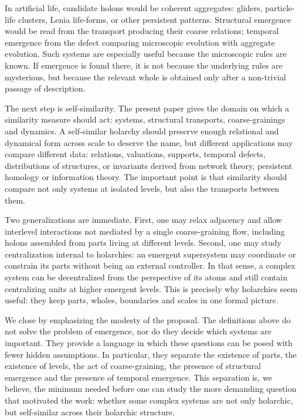 \documentclass[runningheads]{llncs}
\begin{document}
In artificial life, candidate holons would be coherent aggregates: gliders, particle-life clusters, Lenia life-forms, or other persistent patterns. Structural emergence would be read from the transport producing their coarse relations; temporal emergence from the defect comparing microscopic evolution with aggregate evolution. Such systems are especially useful because the microscopic rules are known. If emergence is found there, it is not because the underlying rules are mysterious, but because the relevant whole is obtained only after a non-trivial passage of description.

The next step is self-similarity. The present paper gives the domain on which a similarity measure should act: systems, structural transports, coarse-grainings and dynamics. A self-similar holarchy should preserve enough relational and dynamical form across scale to deserve the name, but different applications may compare different data: relations, valuations, supports, temporal defects, distributions of structures, or invariants derived from network theory, persistent homology or information theory. The important point is that similarity should compare not only systems at isolated levels, but also the transports between them.

Two generalizations are immediate. First, one may relax adjacency and allow interlevel interactions not mediated by a single coarse-graining flow, including holons assembled from parts living at different levels. Second, one may study centralization internal to holarchies: an emergent supersystem may coordinate or constrain its parts without being an external controller. In that sense, a complex system can be decentralized from the perspective of its atoms and still contain centralizing units at higher emergent levels. This is precisely why holarchies seem useful: they keep parts, wholes, boundaries and scales in one formal picture.

We close by emphasizing the modesty of the proposal. The definitions above do not solve the problem of emergence, nor do they decide which systems are important. They provide a language in which these questions can be posed with fewer hidden assumptions. In particular, they separate the existence of parts, the existence of levels, the act of coarse-graining, the presence of structural emergence and the presence of temporal emergence. This separation is, we believe, the minimum needed before one can study the more demanding question that motivated the work: whether some complex systems are not only holarchic, but self-similar across their holarchic structure.
\end{document}
